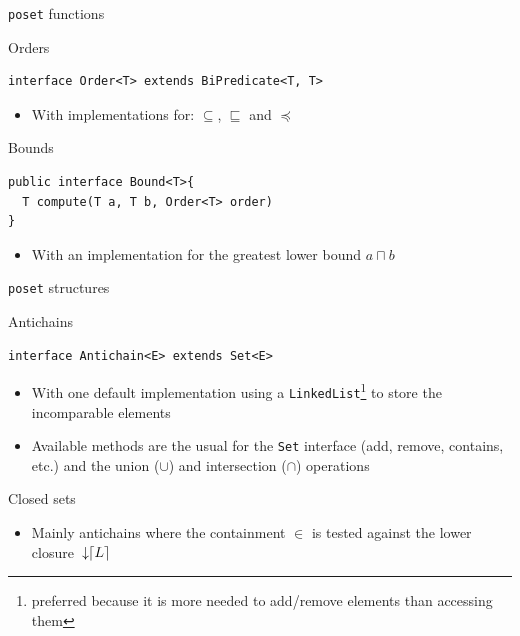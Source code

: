 \documentclass[10pt]{beamer}
\DeclarePairedDelimiter{\ceil}{\lceil}{\rceil}
\newcommand{\darrow}{\, \downarrow \!\!}
\begin{document}
\begin{frame}[fragile]{\texttt{poset} functions}

\begin{block}{Orders}
    \begin{lstlisting}
interface Order<T> extends BiPredicate<T, T>
    \end{lstlisting}
    \begin{itemize}
      \item With implementations for: $\subseteq$, $\sqsubseteq$ and $\preceq$
    \end{itemize}
\end{block}


\begin{block}{Bounds}
    \begin{lstlisting}
public interface Bound<T>{
  T compute(T a, T b, Order<T> order)
}
    \end{lstlisting}
    \begin{itemize}
      \item With an implementation for the greatest lower bound $a \sqcap b$
    \end{itemize}
\end{block}

\end{frame}

\begin{frame}[fragile]{\texttt{poset} structures}

\begin{block}{Antichains}
    \begin{lstlisting}
interface Antichain<E> extends Set<E>
    \end{lstlisting}
    \begin{itemize}
      \item With one default implementation using a \texttt{LinkedList}\footnote{preferred because it is more needed to add/remove elements than accessing them} to store the incomparable elements
      \item Available methods are the usual for the \texttt{Set} interface (add, remove, contains, etc.) and the union ($\cup$) and intersection ($\cap$) operations
    \end{itemize}
\end{block}

\begin{block}{Closed sets}
  \begin{itemize}
    \item   Mainly antichains where the containment $\in$ is tested against the lower closure $\darrow \ceil{L}$
  \end{itemize}
\end{block}

\end{frame}
\end{document}
